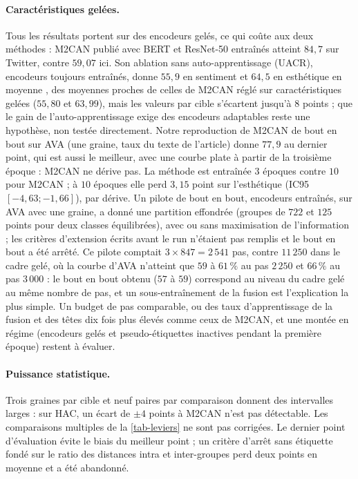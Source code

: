 \documentclass[11pt,a4paper]{article}
\theoremstyle{definition}
\theoremstyle{remark}
\begin{document}
\paragraph{Caractéristiques gelées.}
Tous les résultats portent sur des encodeurs gelés, ce qui coûte aux deux méthodes : M2CAN publié avec BERT et
ResNet-50 entraînés atteint $84{,}7$ sur Twitter, contre $59{,}07$ ici. Son ablation sans auto-apprentissage
(UACR), encodeurs toujours entraînés, donne $55{,}9$ en sentiment et $64{,}5$ en esthétique en moyenne
\citep[tableau~5]{zhao2025msmmda}, des moyennes proches de celles de M2CAN réglé sur caractéristiques gelées
($55{,}80$ et $63{,}99$), mais les valeurs par cible s'écartent jusqu'à $8$ points ; que le gain de
l'auto-apprentissage exige des encodeurs adaptables reste une hypothèse, non testée directement. Notre
reproduction de M2CAN de bout en bout sur AVA (une graine, taux du texte de l'article) donne $77{,}9$ au dernier point,
qui est aussi le meilleur, avec une courbe plate à partir de la troisième époque : M2CAN ne dérive pas. La méthode est
entraînée $3$ époques contre $10$ pour M2CAN ; à $10$ époques elle perd $3{,}15$ point sur l'esthétique
(IC95 $[-4{,}63 ; -1{,}66]$), par dérive. Un pilote de bout en bout, encodeurs entraînés, sur AVA avec une graine, a donné une partition effondrée
(groupes de $722$ et $125$ points pour deux classes équilibrées), avec ou sans maximisation de l'information ; les
critères d'extension écrits avant le run n'étaient pas remplis et le bout en bout a été arrêté. Ce pilote comptait $3 \times 847 = 2\,541$ pas, contre $11\,250$ dans le cadre gelé, où la courbe
d'AVA n'atteint que $59$ à $61\,\%$ au pas $2\,250$ et $66\,\%$ au pas $3\,000$ : le bout en bout obtenu ($57$ à
$59$) correspond au niveau du cadre gelé au même nombre de pas, et un sous-entraînement de la fusion est l'explication
la plus simple. Un budget de pas comparable, ou des taux d'apprentissage de la fusion et des têtes dix fois plus élevés
comme ceux de M2CAN, et une montée en régime (encodeurs gelés et pseudo-étiquettes inactives pendant la première
époque) restent à évaluer.

\paragraph{Puissance statistique.}
Trois graines par cible et neuf paires par comparaison donnent des intervalles larges : sur HAC, un écart de
$\pm 4$ points à M2CAN n'est pas détectable. Les comparaisons multiples de la \cref{tab-leviers} ne sont pas corrigées.
Le dernier point d'évaluation évite le biais du meilleur point ; un critère d'arrêt sans étiquette fondé sur le ratio
des distances intra et inter-groupes perd deux points en moyenne et a été abandonné.
\end{document}
